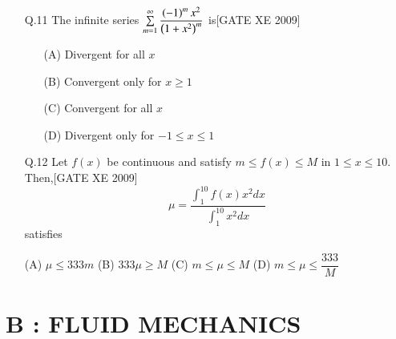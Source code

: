 \documentclass[journal,12pt,onecolumn]{IEEEtran}
\theoremstyle{remark}
\begin{document}
\begin{enumerate}
\item[Q.11] The infinite series $\sum\limits_{m=1}^\infty \dfrac{\left(-1\right)^m x^2}{\left(1 + x^2\right)^m}$ is\hfill[GATE XE 2009]
    \begin{enumerate}
        \item[(A)] Divergent for all $x$
        \item[(B)] Convergent only for $x \geq 1$
        \item[(C)] Convergent for all $x$
        \item[(D)] Divergent only for $-1 \leq x \leq 1$
    \end{enumerate}

\item[Q.12] Let $f(x)$ be continuous and satisfy $m \leq f(x) \leq M$ in $1 \leq x \leq 10$. Then,\hfill[GATE XE 2009]
$$
\mu = \frac{\int_1^{10} f(x) x^2 dx}{\int_1^{10} x^2 dx}
$$
satisfies
   
        (A) $\mu \leq 333 m$\hfill
        (B) $333 \mu \geq M$\hfill
       (C) $m \leq \mu \leq M$\hfill
        (D) $m \leq \mu \leq \dfrac{333}{M}$
    \end{enumerate}


\section*{B : FLUID MECHANICS}

\end{document}
